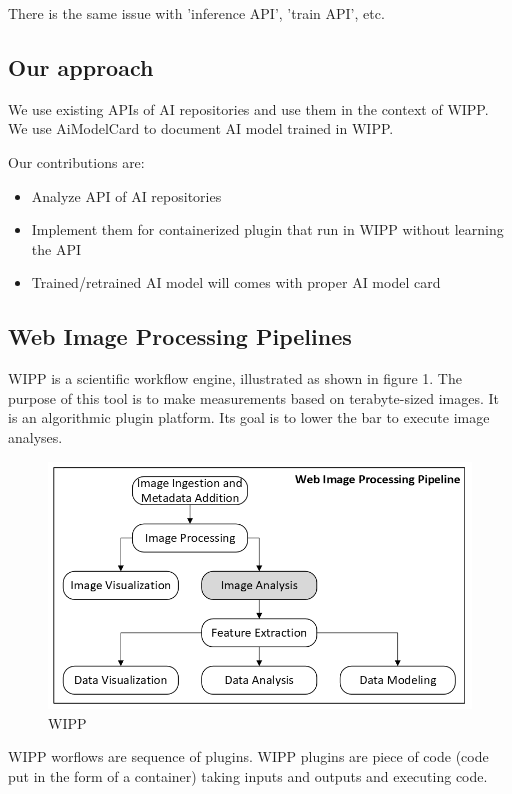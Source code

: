 There is the same issue with 'inference API', 'train API', etc.

\subsection{Our approach}

We use existing APIs of AI repositories and use them in the context of
\Gls{WIPP}. We use \Gls{AiModelCard} to document AI model trained in WIPP.

Our contributions are:
\begin{itemize}
  \item Analyze API of AI repositories
  \item Implement them for containerized plugin that run in WIPP without learning the API
  \item Trained/retrained AI model will comes with proper AI model card
\end{itemize}

\subsection{Web Image Processing Pipelines}

WIPP is a scientific workflow engine, illustrated as shown in figure 1.
The purpose of this tool is to make measurements based on terabyte-sized images.
It is an algorithmic plugin platform. Its goal is to lower the bar to execute
image analyses.

\begin{figure}[H]
  \centering
  \includegraphics[width=1.0\linewidth]{png/methods/wipp.png}
  \caption{WIPP}
  \label{fig:1wipp}
\end{figure}

WIPP worflows are sequence of plugins. WIPP plugins are piece of code (code put
in the form of a container) taking inputs and outputs and executing code.

